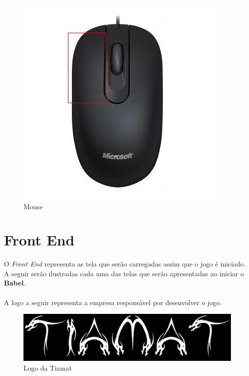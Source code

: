 \documentclass[11pt]{article} %
\begin{document}
\begin{figure}[!htp]
\centering
\includegraphics[scale=0.4]{res/mouse.jpg}
\caption{Mouse}
\label{Mouse}
\end{figure}

\section{Front End}

\paragraph{} O \textit{Front End} representa as tela que serão carregadas assim que o jogo é iniciado. A seguir serão ilustradas cada uma das telas que serão apresentadas ao iniciar o \textbf{Babel}.

\paragraph{} A logo a seguir representa a empresa responsável por desenvolver o jogo.

\begin{figure}[!htp]
\centering
\includegraphics[scale=0.6]{res/tiamat_logo.png}
\caption{Logo da Tiamat}
\label{Logo da Tiamat}
\end{figure}
\end{document}
